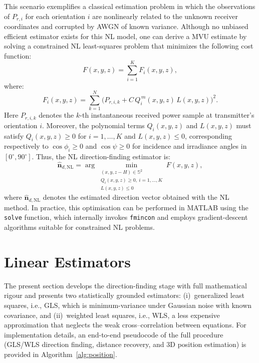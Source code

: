 \documentclass[journal]{IEEEtran}
\newcommand{\deleted}[1]{{\color{red}#1}}
\begin{document}
\deleted{This scenario exemplifies a classical estimation problem in which the observations of $P_{r,i}$ for each orientation $i$ are nonlinearly related to the unknown receiver coordinates and corrupted by AWGN of known variance.  Although no unbiased efficient estimator exists for this NL model, one can derive a MVU estimate by solving a constrained NL least-squares problem that minimizes the following cost function:
\begin{equation}
  F(x,y,z)
  = \sum_{i=1}^{K} F_{i}(x,y,z),
\end{equation}
where:
\begin{equation}
  F_{i}(x,y,z)
  = \sum_{k=1}^{N}\bigl(P_{r,i,k} + C\,Q_{i}^{\,m}(x,y,z)\,L(x,y,z)\bigr)^{2}.
\end{equation}
Here $P_{r,i,k}$ denotes the $k$-th instantaneous received power sample at transmitter's orientation $i$. Moreover, the polynomial terms $Q_{i}(x,y,z)$ and $L(x,y,z)$ must satisfy $Q_{i}(x,y,z)\ge 0$ for $i=1,\ldots,K$ and $L(x,y,z)\le 0$, corresponding respectively to $\cos\phi_{i}\ge0$ and $\cos\psi\ge0$ for incidence and irradiance angles in $[0^\circ,90^\circ]$. Thus, the NL direction-finding estimator is:
\begin{equation}
  \hat{\mathbf n}_{d,\mathrm{NL}}
  = \arg\min_{\substack{(x,y,z-H)\in\mathbb{S}^{2}\\
                      Q_{i}(x,y,z)\ge0,~i=1,\ldots,K\\
                      L(x,y,z)\le0}}
    F(x,y,z),
\end{equation}
where $\hat{\mathbf n}_{d,\mathrm{NL}}$ denotes the estimated direction vector obtained with the NL method. In practice, this optimisation can be performed in MATLAB using the \texttt{solve} function, which internally invokes \texttt{fmincon} and employs gradient-descent algorithms suitable for constrained NL problems.}

\section{Linear Estimators}
\label{sec:Lineal}

The present section develops the direction-finding stage with full mathematical
rigour and presents two statistically grounded estimators:
(i)~generalized least squares, i.e., GLS, which is minimum-variance under
Gaussian noise with known covariance, and
(ii)~weighted least squares, i.e., WLS, a less expensive
approximation that neglects the weak cross–correlation between
equations.
For implementation details, an end-to-end pseudocode of the full procedure (GLS/WLS direction finding, distance recovery, and 3D position estimation) is provided in Algorithm~\ref{alg:position}.
\end{document}
